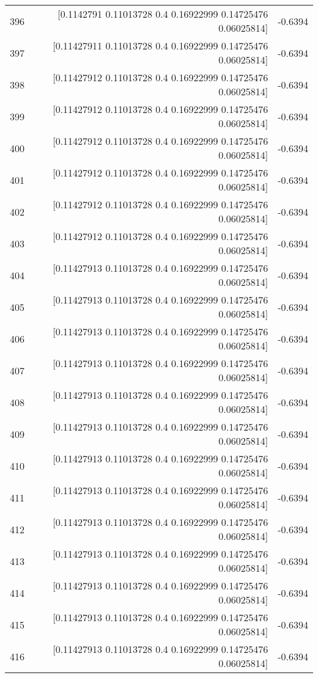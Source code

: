 \begin{longtable}{lrr}
396 & [0.1142791  0.11013728 0.4        0.16922999 0.14725476 0.06025814] & -0.6394 \\
397 & [0.11427911 0.11013728 0.4        0.16922999 0.14725476 0.06025814] & -0.6394 \\
398 & [0.11427912 0.11013728 0.4        0.16922999 0.14725476 0.06025814] & -0.6394 \\
399 & [0.11427912 0.11013728 0.4        0.16922999 0.14725476 0.06025814] & -0.6394 \\
400 & [0.11427912 0.11013728 0.4        0.16922999 0.14725476 0.06025814] & -0.6394 \\
401 & [0.11427912 0.11013728 0.4        0.16922999 0.14725476 0.06025814] & -0.6394 \\
402 & [0.11427912 0.11013728 0.4        0.16922999 0.14725476 0.06025814] & -0.6394 \\
403 & [0.11427912 0.11013728 0.4        0.16922999 0.14725476 0.06025814] & -0.6394 \\
404 & [0.11427913 0.11013728 0.4        0.16922999 0.14725476 0.06025814] & -0.6394 \\
405 & [0.11427913 0.11013728 0.4        0.16922999 0.14725476 0.06025814] & -0.6394 \\
406 & [0.11427913 0.11013728 0.4        0.16922999 0.14725476 0.06025814] & -0.6394 \\
407 & [0.11427913 0.11013728 0.4        0.16922999 0.14725476 0.06025814] & -0.6394 \\
408 & [0.11427913 0.11013728 0.4        0.16922999 0.14725476 0.06025814] & -0.6394 \\
409 & [0.11427913 0.11013728 0.4        0.16922999 0.14725476 0.06025814] & -0.6394 \\
410 & [0.11427913 0.11013728 0.4        0.16922999 0.14725476 0.06025814] & -0.6394 \\
411 & [0.11427913 0.11013728 0.4        0.16922999 0.14725476 0.06025814] & -0.6394 \\
412 & [0.11427913 0.11013728 0.4        0.16922999 0.14725476 0.06025814] & -0.6394 \\
413 & [0.11427913 0.11013728 0.4        0.16922999 0.14725476 0.06025814] & -0.6394 \\
414 & [0.11427913 0.11013728 0.4        0.16922999 0.14725476 0.06025814] & -0.6394 \\
415 & [0.11427913 0.11013728 0.4        0.16922999 0.14725476 0.06025814] & -0.6394 \\
416 & [0.11427913 0.11013728 0.4        0.16922999 0.14725476 0.06025814] & -0.6394 \\

\end{longtable}
